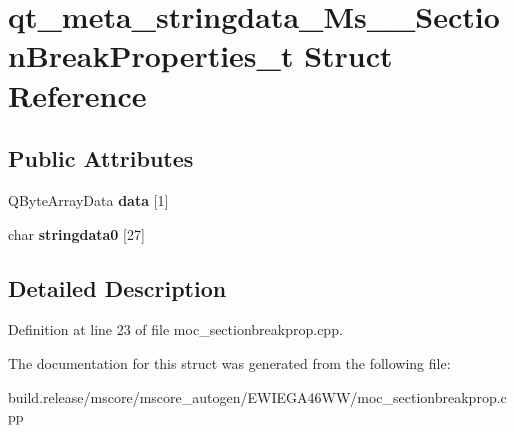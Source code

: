 \hypertarget{structqt__meta__stringdata___ms_____section_break_properties__t}{}\section{qt\+\_\+meta\+\_\+stringdata\+\_\+\+Ms\+\_\+\+\_\+\+Section\+Break\+Properties\+\_\+t Struct Reference}
\label{structqt__meta__stringdata___ms_____section_break_properties__t}
\subsection*{Public Attributes}
\begin{DoxyCompactItemize}
\item 
\mbox{\label{structqt__meta__stringdata___ms_____section_break_properties__t_a9d35f5cba8d75154833024d6d7c1e7d9}} 
Q\+Byte\+Array\+Data {\bfseries data} \mbox{[}1\mbox{]}
\item 
\mbox{\label{structqt__meta__stringdata___ms_____section_break_properties__t_aaefa4636ed75b1667ca8d1c124b423e8}} 
char {\bfseries stringdata0} \mbox{[}27\mbox{]}
\end{DoxyCompactItemize}


\subsection{Detailed Description}


Definition at line 23 of file moc\+\_\+sectionbreakprop.\+cpp.



The documentation for this struct was generated from the following file\+:\begin{DoxyCompactItemize}
\item 
build.\+release/mscore/mscore\+\_\+autogen/\+E\+W\+I\+E\+G\+A46\+W\+W/moc\+\_\+sectionbreakprop.\+cpp\end{DoxyCompactItemize}
